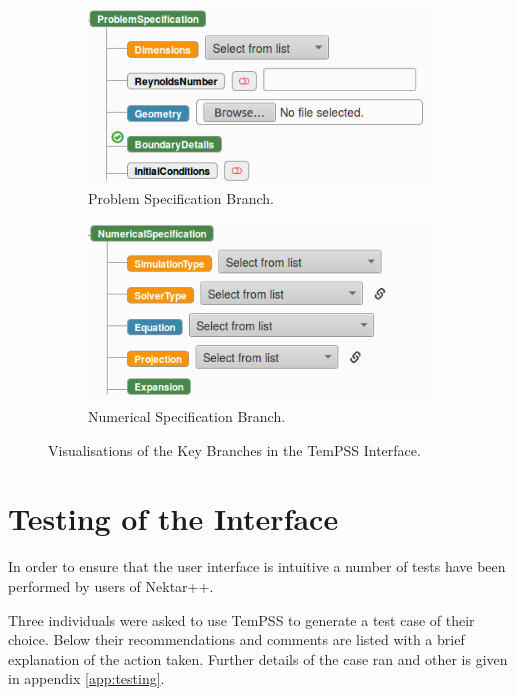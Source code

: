 \documentclass[11pt, a4paper]{report}
\begin{document}
\begin{figure}[!htb]
\centering
\begin{subfigure}{.5\textwidth}
  \centering
  \includegraphics[width=1.\linewidth]{problem_spec}
  \caption{Problem Specification Branch.}
  \label{fig:problem_spec}
\end{subfigure}%
\begin{subfigure}{.5\textwidth}
  \centering
  \includegraphics[width=1.\linewidth]{numerical_spec}
  \caption{Numerical Specification Branch.}
  \label{fig:numerical_spec}
\end{subfigure}
\caption{Visualisations of the Key Branches in the TemPSS Interface.}
\label{fig:branches}
\end{figure}

\newpage
\section{Testing of the Interface}
In order to ensure that the user interface is intuitive a number of tests have been performed by users of Nektar++.

Three individuals were asked to use TemPSS to generate a test case of their choice. Below their recommendations and comments are listed with a brief explanation of the action taken. Further details of the case ran and other is given in appendix \ref{app:testing}.
\end{document}
